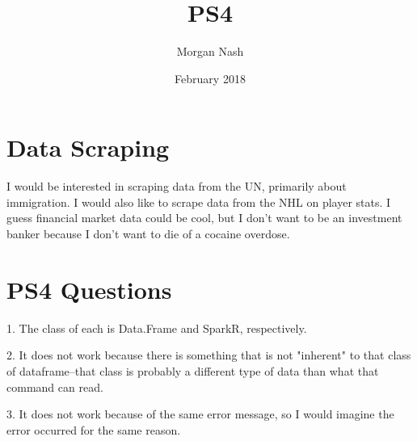 \documentclass{article}
\title{PS4}
\author{Morgan Nash}
\date{February 2018}
\begin{document}
\maketitle

\section{Data Scraping}
I would be interested in scraping data from the UN, primarily about immigration. I would also like to scrape data from the NHL on player stats. I guess financial market data could be cool, but I don't want to be an investment banker because I don't want to die of a cocaine overdose.

\section{PS4 Questions}

1. The class of each is Data.Frame and SparkR, respectively.

2. It does not work because there is something that is not "inherent" to that class of dataframe--that class is probably a different type of data than what that command can read.

3. It does not work because of the same error message, so I would imagine the error occurred for the same reason.
\end{document}
